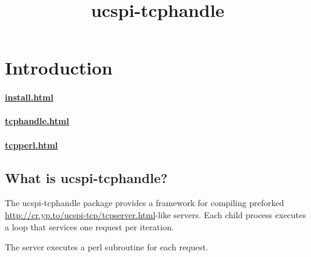 \documentclass{book}
\title{ucspi-tcphandle}
\begin{document}
\section{Introduction}

\paragraph{\href{How to install ucspi-tcphandle}{install.html}}
\paragraph{\href{Creating a server using \cmd{tcphandle.c}}{tcphandle.html}}
\paragraph{\href{The \cmd{tpcperl} program}{tcpperl.html}}


\subsection{What is ucspi-tcphandle?}
The ucspi-tcphandle package provides a framework for compiling preforked
\href{tcpserver}{http://cr.yp.to/ucspi-tcp/tcpserver.html}-like servers.
Each child process executes a loop that services one request per
iteration.

The  server executes a perl subroutine for each request.
\end{document}
